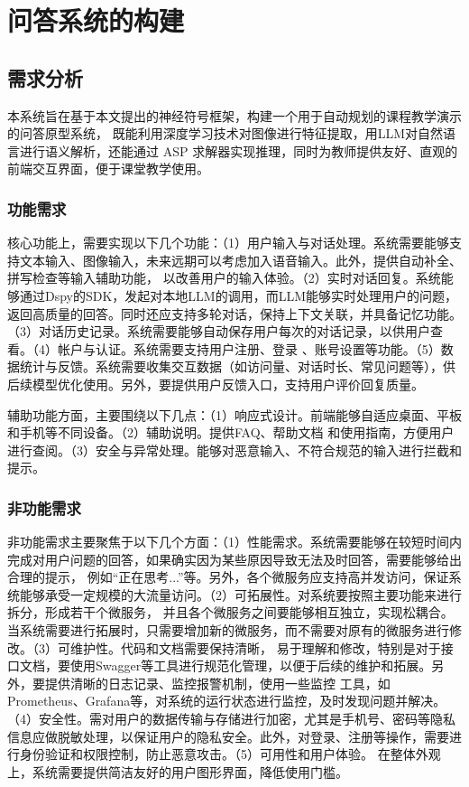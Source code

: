 \chapter{问答系统的构建}
\section{需求分析}
本系统旨在基于本文提出的神经符号框架，构建一个用于自动规划的课程教学演示的问答原型系统，
既能利用深度学习技术对图像进行特征提取，用LLM对自然语言进行语义解析，还能通过 ASP 求解器实现推理，同时为教师提供友好、直观的前端交互界面，便于课堂教学使用。

\subsection{功能需求}
核心功能上，需要实现以下几个功能：（1）用户输入与对话处理。系统需要能够支持文本输入、图像输入，未来远期可以考虑加入语音输入。此外，提供自动补全、拼写检查等输入辅助功能，
以改善用户的输入体验。（2）实时对话回复。系统能够通过Dspy的SDK，发起对本地LLM的调用，而LLM能够实时处理用户的问题，返回高质量的回答。同时还应支持多轮对话，保持上下文关联，并具备记忆功能。（3）对话历史记录。系统需要能够自动保存用户每次的对话记录，以供用户查看。（4）帐户与认证。系统需要支持用户注册、登录
、账号设置等功能。（5）数据统计与反馈。系统需要收集交互数据（如访问量、对话时长、常见问题等），供后续模型优化使用。另外，要提供用户反馈入口，支持用户评价回复质量。

辅助功能方面，主要围绕以下几点：（1）响应式设计。前端能够自适应桌面、平板和手机等不同设备。（2）辅助说明。提供FAQ、帮助文档
和使用指南，方便用户进行查阅。（3）安全与异常处理。能够对恶意输入、不符合规范的输入进行拦截和提示。
\subsection{非功能需求}
非功能需求主要聚焦于以下几个方面：（1）性能需求。系统需要能够在较短时间内完成对用户问题的回答，如果确实因为某些原因导致无法及时回答，需要能够给出合理的提示，
例如“正在思考...”等。另外，各个微服务应支持高并发访问，保证系统能够承受一定规模的大流量访问。（2）可拓展性。对系统要按照主要功能来进行拆分，形成若干个微服务，
并且各个微服务之间要能够相互独立，实现松耦合。当系统需要进行拓展时，只需要增加新的微服务，而不需要对原有的微服务进行修改。（3）可维护性。代码和文档需要保持清晰，
易于理解和修改，特别是对于接口文档，要使用Swagger等工具进行规范化管理，以便于后续的维护和拓展。另外，要提供清晰的日志记录、监控报警机制，使用一些监控
工具，如Prometheus、Grafana等，对系统的运行状态进行监控，及时发现问题并解决。（4）安全性。需对用户的数据传输与存储进行加密，尤其是手机号、密码等隐私信息应做脱敏处理，以保证用户的隐私安全。此外，对登录、注册等操作，需要进行身份验证和权限控制，防止恶意攻击。（5）可用性和用户体验。
在整体外观上，系统需要提供简洁友好的用户图形界面，降低使用门槛。

